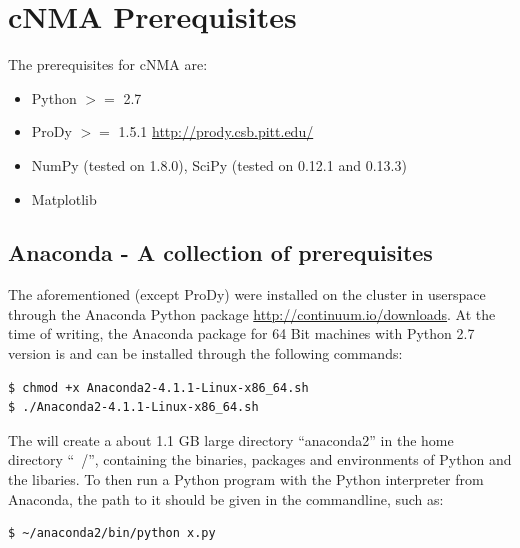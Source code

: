 \documentclass[11pt]{article}
\begin{document}

\section{cNMA Prerequisites}
The prerequisites for cNMA are:

\begin{itemize}
 \item Python $>=$ 2.7
 \item ProDy $>=$ 1.5.1 \url{http://prody.csb.pitt.edu/}
 \item NumPy (tested on 1.8.0), SciPy (tested on 0.12.1 and 0.13.3)
 \item Matplotlib
\end{itemize}

\subsection{Anaconda - A collection of prerequisites}

The aforementioned  (except ProDy) were installed on the cluster in userspace through the Anaconda Python package \url{http://continuum.io/downloads}. At the time of writing, the Anaconda package for 64 Bit machines with Python 2.7 version is  and can be installed through the following commands:

\begin{lstlisting}
$ chmod +x Anaconda2-4.1.1-Linux-x86_64.sh
$ ./Anaconda2-4.1.1-Linux-x86_64.sh
\end{lstlisting}

The will create a about 1.1 GB large directory ``anaconda2'' in the home directory ``~/'', containing the binaries, packages and environments of Python and the libaries. To then run a Python program with the Python interpreter from Anaconda, the path to it should be given in the commandline, such as:

\begin{lstlisting}
$ ~/anaconda2/bin/python x.py
\end{lstlisting}
\end{document}
